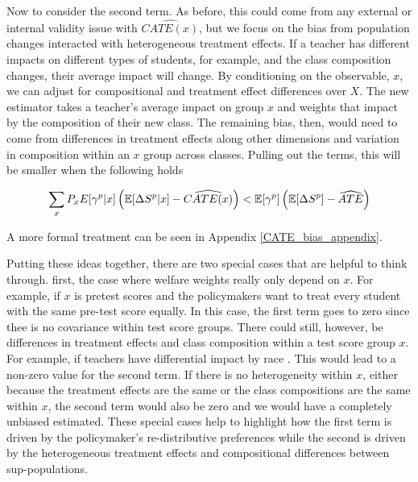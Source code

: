 \documentclass[12pt]{article}
\theoremstyle{definition}
\theoremstyle{definition}
\theoremstyle{definition}
\theoremstyle{definition}
\begin{document}
    Now to consider the second term. As before, this could come from any external or internal validity issue with $\widehat{CATE(x)}$, but we focus on the bias from population changes interacted with heterogeneous treatment effects. If a teacher has different impacts on different types of students, for example, and the class composition changes, their average impact will change. By conditioning on the observable, $x$, we can adjust for compositional and treatment effect differences over $X$. The new estimator takes a teacher's average impact on group $x$ and weights that impact by the composition of their new class. The remaining bias, then, would need to come from differences in treatment effects along other dimensions and variation in composition within an $x$ group across classes. Pulling out the terms, this will be smaller when the following holds

    \begin{equation}
        \sum_{x} P_x  E[\gamma^p|x] \left( \mathbb{E}[\Delta S^p|x]-\widehat{CATE(x)} \right) < \mathbb{E}[\gamma^p] \left (\mathbb{E}[\Delta S^p]-\widehat{ATE} \right )
    \end{equation}
    
    A more formal treatment can be seen in Appendix \ref{CATE_bias_appendix}.

    Putting these ideas together, there are two special cases that are helpful to think through. first, the case where welfare weights really only depend on $x$. For example, if $x$ is pretest scores and the policymakers want to treat every student with the same pre-test score equally. In this case, the first term goes to zero since thee is no covariance within test score groups. There could still, however, be differences in treatment effects and class composition within a test score group $x$. For example, if teachers have differential impact by race \citep{Delgado2020}. This would lead to a non-zero value for the second term. If there is no heterogeneity within $x$, either because the treatment effects are the same or the class compositions are the same within $x$, the second term would also be zero and we would have a completely unbiased estimated. These special cases help to highlight how the first term is driven by the policymaker's re-distributive preferences while the second is driven by the heterogeneous treatment effects and compositional differences between sup-populations. 
\end{document}
